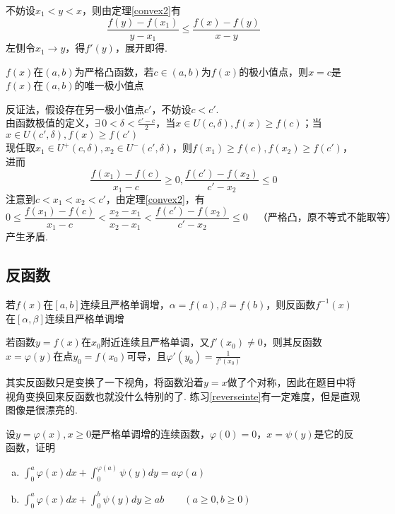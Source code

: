 \begin{analysis}
不妨设$x_1<y<x$，则由定理\ref{convex2}有
\[\frac{f(y)-f(x_1)}{y-x_1}\leq\frac{f(x)-f(y)}{x-y}\]
左侧令$x_1\to y$，得$f'(y)$，展开即得.
\end{analysis}
\begin{theorem}
$f(x)$在$(a,b)$为严格凸函数，若$c\in(a,b)$为$f(x)$的极小值点，则$x=c$是$f(x)$在$(a,b)$的唯一极小值点
\end{theorem}
\begin{analysis}
反证法，假设存在另一极小值点$c'$，不妨设$c<c'$.\\
由函数极值的定义，$\displaystyle\exists\,0<\delta<\frac{c'-c}{2}$，当$x\in U(c,\delta),f(x)\geq f(c)$；当$x\in U(c',\delta),f(x)\geq f(c')$\\
现任取$x_1\in U^+(c,\delta),x_2\in U^-(c',\delta)$，则$f(x_1)\geq f(c),f(x_2)\geq f(c')$，进而
\[\frac{f(x_1)-f(c)}{x_1-c}\geq 0,\frac{f(c')-f(x_2)}{c'-x_2}\leq 0\]
注意到$c<x_1<x_2<c'$，由定理\ref{convex2}，有
\[0\leq\frac{f(x_1)-f(c)}{x_1-c}<\frac{x_2-x_1}{x_2-x_1}<\frac{f(c')-f(x_2)}{c'-x_2}\leq 0\quad\text{（严格凸，原不等式不能取等）}\]
产生矛盾.
\end{analysis}

\subsection{反函数}
\begin{theorem}
	若$f(x)$在$[a,b]$连续且严格单调增，$\alpha=f(a),\beta=f(b)$，则反函数$f^{-1}(x)$在$[\alpha,\beta]$连续且严格单调增
\end{theorem}
\begin{theorem}
若函数$y=f(x)$在$x_0$附近连续且严格单调，又$f'(x_0)\ne 0$，则其反函数$x=\varphi(y)$在点$y_0=f(x_0)$可导，且$\displaystyle\varphi'(y_0)=\frac{1}{f'(x_0)}$
\end{theorem}
\par 其实反函数只是变换了一下视角，将函数沿着$y=x$做了个对称，因此在题目中将视角变换回来反函数也就没什么特别的了. 练习\ref{reverseinte}有一定难度，但是直观图像是很漂亮的.
\begin{exercise}
\label{reverseinte}
设$y=\varphi(x),x\geq 0$是严格单调增的连续函数，$\varphi(0)=0$，$x=\psi(y)$是它的反函数，证明
\begin{enumerate}[(a)]
	\item $\displaystyle\int_0^a\varphi(x)dx+\int_0^{\varphi(a)}\psi(y)dy=a\varphi(a)$
	\item $\displaystyle\int_0^a\varphi(x)dx+\int_0^b\psi(y)dy\geq ab\qquad(a\geq 0,b\geq 0)$
\end{enumerate}
\end{exercise}


